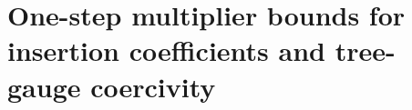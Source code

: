 \section{One-step multiplier bounds for insertion coefficients and tree-gauge coercivity}
\label{app:multiplier_and_lambda}




